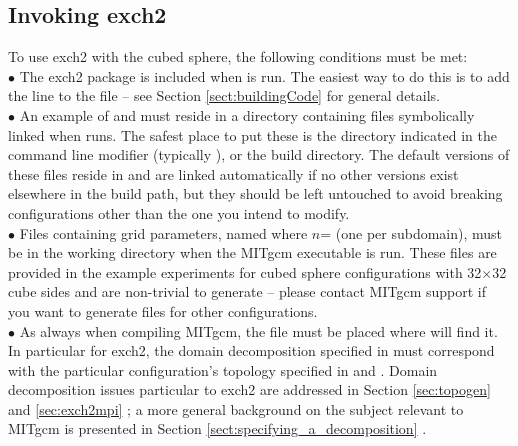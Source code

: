\subsection{Invoking exch2}

To use exch2 with the cubed sphere, the following conditions must be
met: \\

$\bullet$ The exch2 package is included when  is run.
  The easiest way to do this is to add the line  to the
   file -- see Section
  \ref{sect:buildingCode}  for general
  details. \\

$\bullet$ An example of  and
   must reside in a directory containing files
  symbolically linked when  runs.  The safest place to
  put these is the directory indicated in the  command
  line modifier (typically ), or the build directory.
  The default versions of these files reside in  and
  are linked automatically if no other versions exist elsewhere in the
  build path, but they should be left untouched to avoid breaking
  configurations other than the one you intend to modify.\\

$\bullet$ Files containing grid parameters, named
   where $n$= (one per subdomain),
  must be in the working directory when the MITgcm executable is run.
  These files are provided in the example experiments for cubed sphere
  configurations with 32$\times$32 cube sides and are non-trivial to
  generate -- please contact MITgcm support if you want to generate
  files for other configurations. \\

$\bullet$ As always when compiling MITgcm, the file  must
  be placed where  will find it.  In particular for
  exch2, the domain decomposition specified in  must
  correspond with the particular configuration's topology specified in
   and .  Domain
  decomposition issues particular to exch2 are addressed in Section
  \ref{sec:topogen} 
  and \ref{sec:exch2mpi} ; a more
  general background on the subject relevant to MITgcm is presented in
  Section \ref{sect:specifying_a_decomposition}
  .\\

